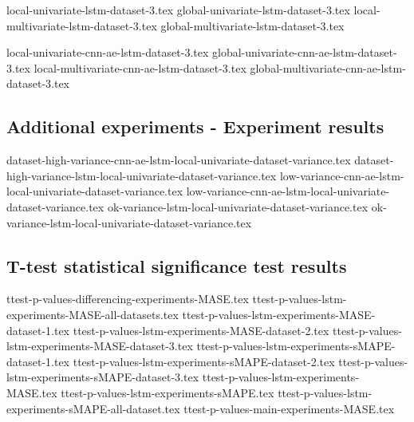 {local-univariate-lstm-dataset-3.tex}
{global-univariate-lstm-dataset-3.tex}
{local-multivariate-lstm-dataset-3.tex}
{global-multivariate-lstm-dataset-3.tex}

{local-univariate-cnn-ae-lstm-dataset-3.tex}
{global-univariate-cnn-ae-lstm-dataset-3.tex}
{local-multivariate-cnn-ae-lstm-dataset-3.tex}
{global-multivariate-cnn-ae-lstm-dataset-3.tex}

\subsection{Additional experiments - Experiment results}
{dataset-high-variance-cnn-ae-lstm-local-univariate-dataset-variance.tex}
{dataset-high-variance-lstm-local-univariate-dataset-variance.tex}
{low-variance-cnn-ae-lstm-local-univariate-dataset-variance.tex}
{low-variance-cnn-ae-lstm-local-univariate-dataset-variance.tex}
{ok-variance-lstm-local-univariate-dataset-variance.tex}
{ok-variance-lstm-local-univariate-dataset-variance.tex}

\subsection{T-test statistical significance test results}
{ttest-p-values-differencing-experiments-MASE.tex}
{ttest-p-values-lstm-experiments-MASE-all-datasets.tex}
{ttest-p-values-lstm-experiments-MASE-dataset-1.tex}
{ttest-p-values-lstm-experiments-MASE-dataset-2.tex}
{ttest-p-values-lstm-experiments-MASE-dataset-3.tex}
{ttest-p-values-lstm-experiments-sMAPE-dataset-1.tex}
{ttest-p-values-lstm-experiments-sMAPE-dataset-2.tex}
{ttest-p-values-lstm-experiments-sMAPE-dataset-3.tex}
{ttest-p-values-lstm-experiments-MASE.tex}
{ttest-p-values-lstm-experiments-sMAPE.tex}
{ttest-p-values-lstm-experiments-sMAPE-all-dataset.tex}
{ttest-p-values-main-experiments-MASE.tex}

